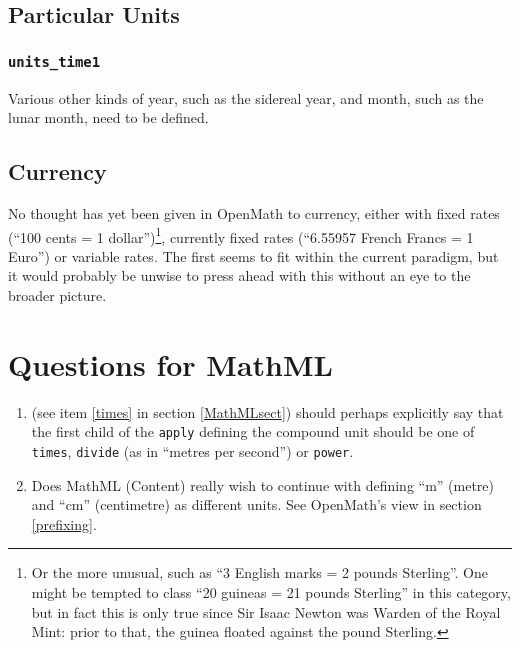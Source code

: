 \documentclass[11pt]{openmathTN}
\def\action#1{\hfill\rlap{\bf #1}}
\begin{document}
\subsection{Particular Units}
\subsubsection{{\tt units\_time1}}
Various other kinds of year, such as the sidereal year, and month, such as
the lunar month, need to be defined.\action{JHD}
\subsection{Currency}
No thought has yet been given in OpenMath to currency, either with
fixed rates (``100 cents = 1 dollar'')\footnote{Or the more unusual, such
as ``3 English marks = 2 pounds Sterling''. One might be tempted to class
``20 guineas = 21 pounds Sterling'' in this category, but in fact this is
only true since Sir Isaac Newton was Warden of the Royal Mint: prior to
that, the guinea floated against the pound Sterling.}, currently
fixed rates (``6.55957 French Francs = 1 Euro'') or variable rates. The first
seems to fit within the current paradigm, but it would probably be unwise
to press ahead with this without an eye to the broader picture.
\section{Questions for MathML}\label{MathMLfuture}
\begin{enumerate}
\item\cite[section 3]{WorldWideWebConsortium2003} (see item \ref{times} in
section \ref{MathMLsect}) should perhaps explicitly say that the first
child of the {\tt apply} defining the compound unit should be one of {\tt
times}, {\tt divide} (as in ``metres per second'') or {\tt power}.
\item Does MathML (Content) really wish to continue with defining ``m''
(metre) and ``cm'' (centimetre) as different units. See OpenMath's view in
section \ref{prefixing}.
\end{enumerate}
\end{document}
